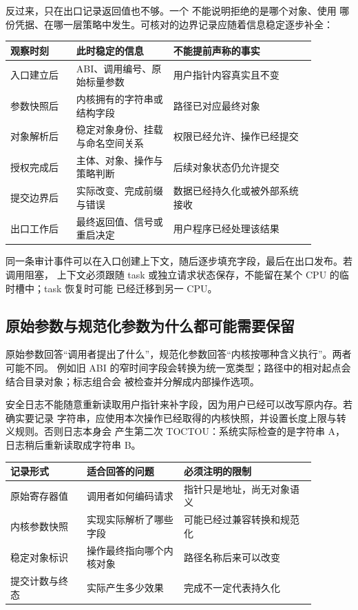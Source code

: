 反过来，只在出口记录返回值也不够。一个  不能说明拒绝的是哪个对象、使用
哪份凭据、在哪一层策略中发生。可核对的边界记录应随着信息稳定逐步补全：

\begin{longtable}{|L{0.19\linewidth}|L{0.28\linewidth}|L{0.41\linewidth}|}
\hline
观察时刻 & 此时稳定的信息 & 不能提前声称的事实 \\ \hline
入口建立后 & ABI、调用编号、原始标量参数 & 用户指针内容真实且不变 \\ \hline
参数快照后 & 内核拥有的字符串或结构字段 & 路径已对应最终对象 \\ \hline
对象解析后 & 稳定对象身份、挂载与命名空间关系 & 权限已经允许、操作已经提交 \\ \hline
授权完成后 & 主体、对象、操作与策略判断 & 后续对象状态仍允许提交 \\ \hline
提交边界后 & 实际改变、完成前缀与错误 & 数据已经持久化或被外部系统接收 \\ \hline
出口工作后 & 最终返回值、信号或重启决定 & 用户程序已经处理该结果 \\ \hline
\end{longtable}

同一条审计事件可以在入口创建上下文，随后逐步填充字段，最后在出口发布。若调用阻塞，
上下文必须跟随 task 或独立请求状态保存，不能留在某个 CPU 的临时槽中；task 恢复时可能
已经迁移到另一 CPU。

\subsection{原始参数与规范化参数为什么都可能需要保留}

原始参数回答“调用者提出了什么”，规范化参数回答“内核按哪种含义执行”。两者可能不同。
例如旧 ABI 的窄时间字段会转换为统一宽类型；路径中的相对起点会结合目录对象；标志组合会
被检查并分解成内部操作选项。

安全日志不能随意重新读取用户指针来补字段，因为用户已经可以改写原内存。若确实要记录
字符串，应使用本次操作已经取得的内核快照，并设置长度上限与转义规则。否则日志本身会
产生第二次 TOCTOU：系统实际检查的是字符串 A，日志稍后重新读取成字符串 B。

\begin{longtable}{|L{0.22\linewidth}|L{0.28\linewidth}|L{0.38\linewidth}|}
\hline
记录形式 & 适合回答的问题 & 必须注明的限制 \\ \hline
原始寄存器值 & 调用者如何编码请求 & 指针只是地址，尚无对象语义 \\ \hline
内核参数快照 & 实现实际解析了哪些字段 & 可能已经过兼容转换和规范化 \\ \hline
稳定对象标识 & 操作最终指向哪个内核对象 & 路径名称后来可以改变 \\ \hline
提交计数与终态 & 实际产生多少效果 & 完成不一定代表持久化 \\ \hline
\end{longtable}

